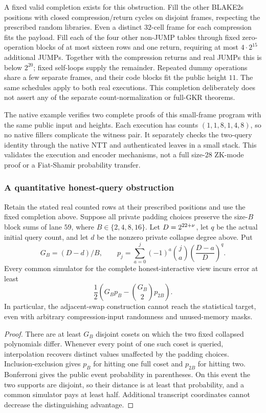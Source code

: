 A fixed valid completion exists for this obstruction. Fill the other BLAKE2s positions with closed compression/return cycles on disjoint frames, respecting the prescribed random libraries. Even a distinct $32$-cell frame for each compression fits the payload. Fill each of the four other non-JUMP tables through fixed zero-operation blocks of at most sixteen rows and one return, requiring at most $4\cdot2^{15}$ additional JUMPs. Together with the compression returns and real JUMPs this is below $2^{20}$; fixed self-loops supply the remainder. Repeated dummy operations share a few separate frames, and their code blocks fit the public height $11$. The same schedules apply to both real executions. This completion deliberately does not assert any of the separate count-normalization or full-GKR theorems.

The native example  verifies two complete proofs of this small-frame program with the same public input and heights. Each execution has counts $(1,1,8,1,4,8)$, so no native fillers complicate the witness pair. It separately checks the two-query identity through the native NTT and authenticated leaves in a small stack. This validates the execution and encoder mechanisms, not a full size-$28$ ZK-mode proof or a Fiat-Shamir probability transfer.

\subsubsection{A quantitative honest-query obstruction}

\begin{theorem}\label{thm:zk-flock-pair-floor}
Retain the stated real counted rows at their prescribed positions and use the fixed completion above. Suppose all private padding choices preserve the size-$B$ block sums of lane $59$, where $B\in\{2,4,8,16\}$. Let $D=2^{22+\nu}$, let $q$ be the actual initial query count, and let $d$ be the nonzero private collapse degree above. Put
\[
 G_B=(D-d)/B,\qquad
 p_j=\sum_{a=0}^j(-1)^a\binom ja\left(\frac{D-a}{D}\right)^q.
\]
Every common simulator for the complete honest-interactive view incurs error at least
\[
 \frac12\left(G_Bp_B-\binom{G_B}{2}p_{2B}\right).
\]
In particular, the adjacent-swap construction cannot reach the statistical target, even with arbitrary compression-input randomness and unused-memory masks.
\end{theorem}
\begin{proof}
There are at least $G_B$ disjoint cosets on which the two fixed collapsed polynomials differ. Whenever every point of one such coset is queried, interpolation recovers distinct values unaffected by the padding choices. Inclusion-exclusion gives $p_B$ for hitting one full coset and $p_{2B}$ for hitting two. Bonferroni gives the public event probability in parentheses. On this event the two supports are disjoint, so their distance is at least that probability, and a common simulator pays at least half. Additional transcript coordinates cannot decrease the distinguishing advantage.
\end{proof}

